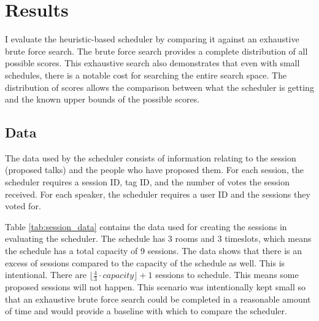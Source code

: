 \chapter{Results}\label{ch:Results}
I evaluate the heuristic-based scheduler by comparing it against an exhaustive brute force search. The brute force search provides a complete distribution of all possible scores. This exhaustive search also demonstrates that even with small schedules, there is a notable cost for searching the entire search space. The distribution of scores allows the comparison between what the scheduler is getting and the known upper bounds of the possible scores.
%
\section{Data}
The data used by the scheduler consists of information relating to the session (proposed talks) and the people who have proposed them. For each session, the scheduler requires a session ID, tag ID, and the number of votes the session received. For each speaker, the scheduler requires a user ID and the sessions they voted for. 


Table \ref{tab:session_data} contains the data used for creating the sessions in evaluating the scheduler. The schedule has 3 rooms and 3 timeslots, which means the schedule has a total capacity of 9 sessions. The data shows that there is an excess of sessions compared to the capacity of the schedule as well. This is intentional. There are $\lfloor\frac{4}{3}\cdot capacity\rfloor+1$ sessions to schedule. This means some proposed sessions will not happen. This scenario was intentionally kept small so that an exhaustive brute force search could be completed in a reasonable amount of time and would provide a baseline with which to compare the scheduler.

